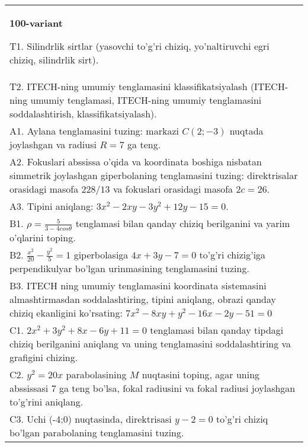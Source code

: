 \documentclass{article}
\begin{document}
\begin{tabular}{m{17cm}}
\textbf{100-variant}
\newline

T1. Silindrlik sirtlar (yasovchi to'g'ri chiziq, yo'naltiruvchi egri chiziq, silindrlik sirt).\\

T2. ITECH-ning umumiy tenglamasini klassifikatsiyalash (ITECH-ning umumiy tenglamasi, ITECH-ning umumiy tenglamasini soddalashtirish, klassifikatsiyalash).\\

A1. Aylana tenglamasini tuzing: markazi $C(2;-3)$ nuqtada joylashgan va radiusi $R=7$ ga teng.\\

A2. Fokuslari abssissa o'qida va koordinata boshiga nisbatan simmetrik joylashgan giperbolaning tenglamasini tuzing: direktrisalar orasidagi masofa $228/13$ va fokuslari orasidagi masofa $2c=26$.\\

A3. Tipini aniqlang: $3x^{2}-2xy-3y^{2}+12y-15=0$.\\

B1. $\rho = \frac{5}{3 - 4cos\theta}$ tenglamasi bilan qanday chiziq berilganini va yarim o'qlarini toping.  \\

B2. $\frac{x^{2}}{20} - \frac{y^{2}}{5} = 1$ giperbolasiga $4x + 3y - 7 = 0$ to'g'ri chizig'iga perpendikulyar bo'lgan urinmasining tenglamasini tuzing.  \\

B3. ITECH ning umumiy tenglamasini koordinata sistemasini almashtirmasdan soddalashtiring, tipini aniqlang, obrazi qanday chiziq ekanligini ko'rsating: $7x^{2} - 8xy + y^{2} - 16x - 2y - 51 = 0$\\

C1. $2x^{2} + 3y^{2} + 8x - 6y + 11 = 0$ tenglamasi bilan qanday tipdagi chiziq berilganini aniqlang va uning tenglamasini soddalashtiring va grafigini chizing.  \\

C2. $y^{2} = 20x$ parabolasining $M$ nuqtasini toping, agar uning abssissasi 7 ga teng bo'lsa, fokal radiusini va fokal radiusi joylashgan to'g'rini aniqlang.\\

C3. Uchi (-4;0) nuqtasinda, direktrisasi $y - 2 = 0$ to'g'ri chiziq bo'lgan parabolaning tenglamasini tuzing.\\

\end{tabular}
\vspace{1cm}
\end{document}
